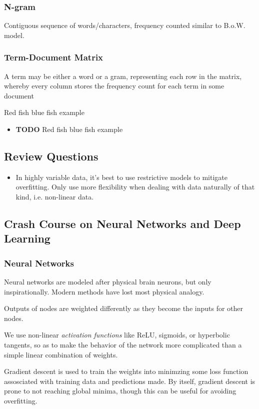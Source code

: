 \documentclass[11pt]{article}
\begin{document}
\begin{itemize}
\subsubsection*{N-gram}
\label{sec-5-3-3}
Contiguous sequence of words/characters, frequency counted similar to B.o.W. model.

\subsubsection*{Term-Document Matrix}
\label{sec-5-3-4}
A term may be either a word or a gram, representing each row in the matrix, whereby every column stores the frequency count for each term in some document

Red fish blue fish example

\begin{itemize}
\item {\bfseries\sffamily TODO} Red fish blue fish example
\label{sec-5-3-4-1}
\end{itemize}
\subsection{Review Questions}
\label{sec-5-4}
\begin{itemize}
\item In highly variable data, it's best to use restrictive models to mitigate overfitting. Only use more flexibility when dealing with data naturally of that kind, i.e. non-linear data.
\end{itemize}
\subsection{Crash Course on Neural Networks and Deep Learning}
\label{sec-5-5}
\subsubsection*{Neural Networks}
\label{sec-5-5-1}
Neural networks are modeled after physical brain neurons, but only inspirationally. Modern methods have lost most physical analogy.

Outputs of nodes are weighted differently as they become the inputs for other nodes.

We use non-linear \emph{activation functions} like ReLU, sigmoids, or hyperbolic tangents, so as to make the behavior of the network more complicated than a simple linear combination of weights.

Gradient descent is used to train the weights into minimzing some loss function assosciated with training data and predictions made. By itself, gradient descent is prone to not reaching global minima, though this can be useful for avoiding overfitting.


\end{itemize}
\end{document}
